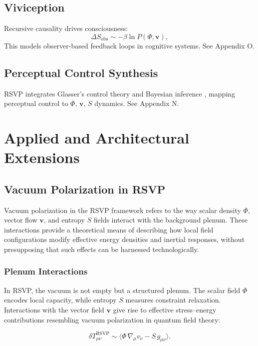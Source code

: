 \documentclass[12pt]{report}
\newcommand{\PhiRSVP}{\Phi}
\newcommand{\vRSVP}{\mathbf{v}}
\newcommand{\SRSVP}{S}
\begin{document}
\chapter{Viviception}
Recursive causality drives consciousness:
\begin{equation}
\Delta \SRSVP_{\text{obs}} \sim -\beta \ln P(\PhiRSVP, \vRSVP), \label{eq:viviception}
\end{equation}
This models observer-based feedback loops in cognitive systems. See Appendix O.

\chapter{Perceptual Control Synthesis}
RSVP integrates Glasser’s control theory \citep{Glasser1985} and Bayesian inference \citep{Friston2010}, mapping perceptual control to \(\PhiRSVP\), \(\vRSVP\), \(\SRSVP\) dynamics. See Appendix N.

\part{Applied and Architectural Extensions}

\chapter{Vacuum Polarization in RSVP}

Vacuum polarization in the RSVP framework refers to the way scalar density $\Phi$, vector flow $\mathbf{v}$, and entropy $S$ fields interact with the background plenum. These interactions provide a theoretical means of describing how local field configurations modify effective energy densities and inertial responses, without presupposing that such effects can be harnessed technologically.

\section{Plenum Interactions}

In RSVP, the vacuum is not empty but a structured plenum. The scalar field $\Phi$ encodes local capacity, while entropy $S$ measures constraint relaxation. Interactions with the vector field $\mathbf{v}$ give rise to effective stress--energy contributions resembling vacuum polarization in quantum field theory:

\begin{equation}
\delta T_{\mu\nu}^{\text{RSVP}} \sim \langle \Phi \, \nabla_\mu v_\nu - S \, g_{\mu\nu} \rangle.
\end{equation}
\end{document}
